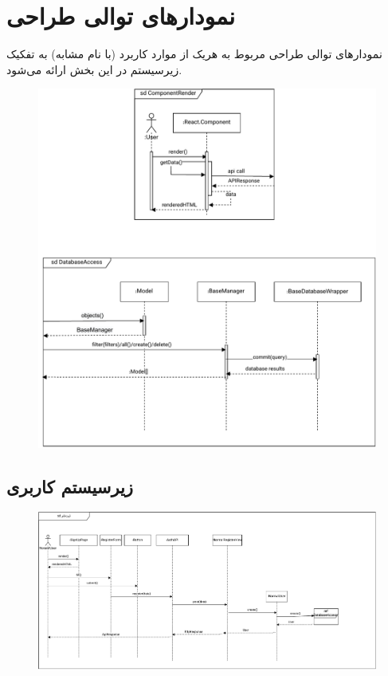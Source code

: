 \chapter{نمودارهای توالی طراحی}


نمودارهای توالی طراحی مربوط به هریک از موارد کاربرد (با نام مشابه) به تفکیک زیرسیستم در این بخش ارائه می‌شود.



\begin{figure}[ht!]
	\centering
	\includegraphics[scale=0.8]{figs/design-sequence/reusable.pdf}
\end{figure}
\FloatBarrier
\newpage


\section{زیرسیستم کاربری}

\eject \pdfpagewidth=12in \pdfpageheight=7in
\begin{figure}[ht!]
	\centering
	\includegraphics[scale=0.8]{figs/design-sequence/3-1.pdf}
\end{figure}
\FloatBarrier
\newpage

